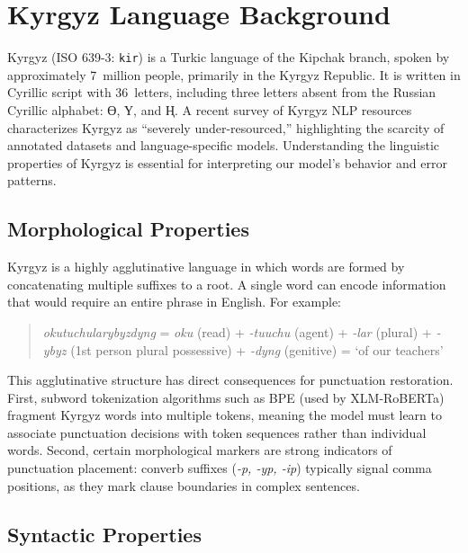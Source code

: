 \documentclass[manuscript, review]{acmart}
\newcommand{\cyr}[1]{{\cyrfont #1}}
\begin{document}
\section{Kyrgyz Language Background}
\label{sec:kyrgyz}

Kyrgyz (ISO 639-3: \texttt{kir}) is a Turkic language of the Kipchak branch, spoken by approximately 7~million people, primarily in the Kyrgyz Republic. It is written in Cyrillic script with 36~letters, including three letters absent from the Russian Cyrillic alphabet: \cyr{Ө}, \cyr{Ү}, and \cyr{Ң}. A recent survey of Kyrgyz NLP resources~\cite{alekseev2024kyrgyznlp} characterizes Kyrgyz as ``severely under-resourced,'' highlighting the scarcity of annotated datasets and language-specific models. Understanding the linguistic properties of Kyrgyz is essential for interpreting our model's behavior and error patterns.

\subsection{Morphological Properties}

Kyrgyz is a highly agglutinative language in which words are formed by concatenating multiple suffixes to a root. A single word can encode information that would require an entire phrase in English. For example:

\begin{quote}
\textit{okutuchularybyzdyng} = \textit{oku} (read) + \textit{-tuuchu} (agent) + \textit{-lar} (plural) + \textit{-ybyz} (1st person plural possessive) + \textit{-dyng} (genitive) = `of our teachers'
\end{quote}

This agglutinative structure has direct consequences for punctuation restoration. First, subword tokenization algorithms such as BPE (used by XLM-RoBERTa) fragment Kyrgyz words into multiple tokens, meaning the model must learn to associate punctuation decisions with token sequences rather than individual words. Second, certain morphological markers are strong indicators of punctuation placement: converb suffixes (\textit{-p, -yp, -ip}) typically signal comma positions, as they mark clause boundaries in complex sentences.

\subsection{Syntactic Properties}
\end{document}
